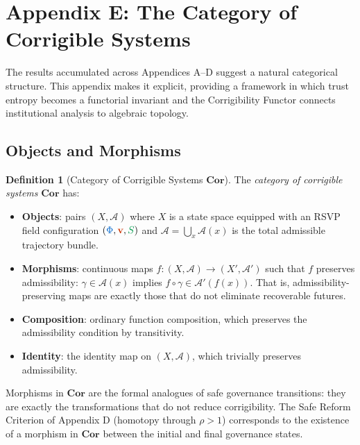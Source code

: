 \documentclass[11pt,a4paper]{article}
\newcommand{\scalar}[1]{\textcolor{scalarcolor}{\ensuremath{#1}}}
\newcommand{\vect}[1]{\textcolor{vectorcolor}{\ensuremath{\mathbf{#1}}}}
\newcommand{\entropy}[1]{\textcolor{entropycolor}{\ensuremath{#1}}}
\theoremstyle{definition}
\newtheorem{definition}{Definition}
\theoremstyle{plain}
\begin{document}
\section*{Appendix E: The Category of Corrigible Systems}

\begin{mdframed}[style=appendixbox]

The results accumulated across Appendices A--D suggest a natural categorical structure. This appendix makes it explicit, providing a framework in which trust entropy becomes a functorial invariant and the Corrigibility Functor connects institutional analysis to algebraic topology.

\subsection{Objects and Morphisms}

\begin{definition}[Category of Corrigible Systems $\mathbf{Cor}$]
The \emph{category of corrigible systems} $\mathbf{Cor}$ has:
\begin{itemize}
\item \textbf{Objects}: pairs $(X, \mathcal{A})$ where $X$ is a state space equipped with an RSVP field configuration $(\scalar{\Phi}, \vect{v}, \entropy{S})$ and $\mathcal{A} = \bigcup_x \mathcal{A}(x)$ is the total admissible trajectory bundle.
\item \textbf{Morphisms}: continuous maps $f : (X, \mathcal{A}) \to (X', \mathcal{A}')$ such that $f$ preserves admissibility: $\gamma \in \mathcal{A}(x)$ implies $f \circ \gamma \in \mathcal{A}'(f(x))$. That is, admissibility-preserving maps are exactly those that do not eliminate recoverable futures.
\item \textbf{Composition}: ordinary function composition, which preserves the admissibility condition by transitivity.
\item \textbf{Identity}: the identity map on $(X, \mathcal{A})$, which trivially preserves admissibility.
\end{itemize}
\end{definition}

Morphisms in $\mathbf{Cor}$ are the formal analogues of safe governance transitions: they are exactly the transformations that do not reduce corrigibility. The Safe Reform Criterion of Appendix D (homotopy through $\rho > 1$) corresponds to the existence of a morphism in $\mathbf{Cor}$ between the initial and final governance states.


\end{mdframed}
\end{document}
